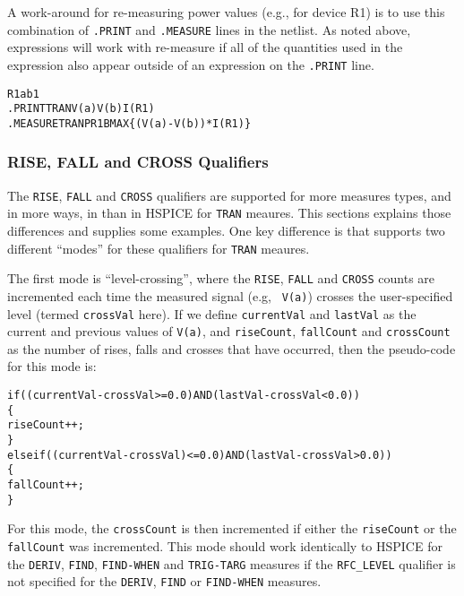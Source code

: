 A work-around for re-measuring power values (e.g., for device R1) is
to use this combination of {\tt .PRINT} and {\tt .MEASURE} lines in
the netlist.  As noted above, expressions will work with re-measure if
all of the quantities used in the expression also appear outside of an
expression on the {\tt .PRINT} line.
\begin{alltt}
R1 a b 1
.PRINT TRAN V(a) V(b) I(R1)
.MEASURE TRAN PR1B MAX \{(V(a)-V(b))*I(R1)\}
\end{alltt}

\subsubsection{RISE, FALL and CROSS Qualifiers}
The \texttt{RISE}, \texttt{FALL} and \texttt{CROSS} qualifiers are
supported for more measures types, and in more ways, in \Xyce{} than
in HSPICE for \texttt{TRAN} meaures.  This sections explains those
differences and supplies some examples.  One key difference is that
\Xyce{} supports two different ``modes'' for these qualifiers for
\texttt{TRAN} meaures.

The first mode is ``level-crossing'', where
the \texttt{RISE}, \texttt{FALL} and \texttt{CROSS} counts are
incremented each time the measured signal (e.g,
\texttt{ V(a)}) crosses the user-specified level (termed
\texttt{crossVal} here).  If we define \texttt{currentVal} and \texttt{lastVal}
as the current and previous values of \texttt{V(a)}, and \texttt{riseCount},
\texttt{fallCount} and \texttt{crossCount} as the number of rises, falls and
crosses that have occurred, then the pseudo-code for this mode is:
\begin{alltt}
if ( (currentVal-crossVal >= 0.0) AND (lastVal-crossVal < 0.0) )
\{
  riseCount++;
\}
else if( (currentVal-crossVal) <= 0.0) AND (lastVal-crossVal > 0.0) )
\{
  fallCount++;
\}
\end{alltt}

For this mode, the \texttt{crossCount} is then incremented if either
the
\texttt{riseCount}  or the \texttt{fallCount} was incremented.  This mode
should work identically to HSPICE for
the \texttt{DERIV}, \texttt{FIND},
\texttt{FIND-WHEN} and \texttt{TRIG-TARG} measures if the \texttt{RFC\_LEVEL}
qualifier is not specified for the \texttt{DERIV}, \texttt{FIND}
or \texttt{FIND-WHEN} measures.

